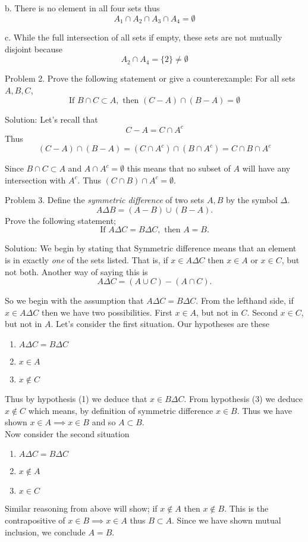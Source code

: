 \documentclass[16 pt]{amsart}
\theoremstyle{definition}
\theoremstyle{remark}
\numberwithin{equation}{subsection}
\begin{document}
b. There is no element in all four sets thus
\[
A_1\cap A_2\cap A_3\cap A_4 = \emptyset
\]

c. While the full intersection of all sets if empty, these sets are not mutually disjoint because
\[
A_2\cap A_4 = \{2\} \neq \emptyset
\]

\newpage
Problem 2.
Prove the following statement or give a counterexample: For all sets $A,B,C$,
\[
\text{If } B\cap C \subset A, \text{ then } (C-A)\cap (B-A) = \emptyset
\]

Solution: Let's recall that 
\[
C-A = C\cap A^c
\]
Thus
\[
(C-A)\cap (B-A) = (C\cap A^c)\cap (B\cap A^c) = C\cap B\cap A^c
\]

Since $B\cap C \subset A$ and $A\cap A^c = \emptyset$ this means that no subset of $A$ will have any intersection with $A^c$. Thus $(C\cap B)\cap A^c = \emptyset$.

\newpage
Problem 3. Define the \emph{symmetric difference} of two sets $A,B$ by the symbol $\Delta$.  
\[
A\Delta B = (A-B)\cup (B-A).
\]
Prove the following statement;
\[
\text{If } A\Delta C = B\Delta C, \text{ then } A=B.
\]

Solution:  We begin by stating that Symmetric difference means that an element is in exactly \emph{one} of the sets listed.  That is, if $x\in A\Delta C$ then $x\in A$ or $x\in C$, but not both.  Another way of saying this is
\[
A\Delta C = (A\cup C) - (A\cap C).
\]

So we begin with the assumption that $A\Delta C = B\Delta C$.  From the lefthand side, if $x\in A\Delta C$ then we have two possibilities.  First $x\in A$, but not in $C$.  Second $x\in C$, but not in $A$.  Let's consider the first situation.  Our hypotheses are these
\begin{enumerate}
\item $A\Delta C = B\Delta C$\\
\item $x\in A$\\
\item $x\notin C$
\end{enumerate}

Thus by hypothesis (1) we deduce that $x\in B\Delta C$.  From hypothesis (3) we deduce $x\notin C$ which means, by definition of symmetric difference $x\in B$.  Thus we have shown $x\in A \implies x\in B$ and so $A\subset B$.\\

Now consider the second situation
\begin{enumerate}
\item $A\Delta C = B\Delta C$\\
\item $x\notin A$\\
\item $x\in C$
\end{enumerate}
Similar reasoning from above will show; if $x\notin A$ then $x\notin B$.  This is the contrapositive of $x\in B \implies x\in A$ thus $B\subset A$.  Since we have shown mutual inclusion, we conclude $A=B$.
\end{document}
